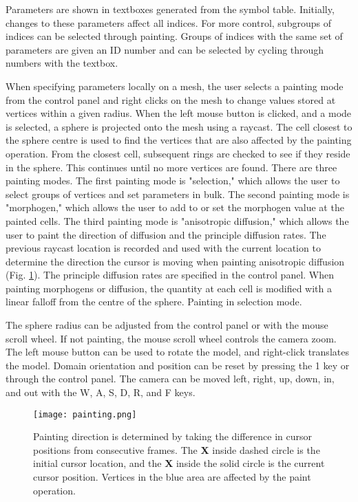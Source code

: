 Parameters are shown in textboxes generated from the symbol table. Initially, changes to these parameters affect all indices. For more control, subgroups of indices can be selected through painting. Groups of indices with the same set of parameters are given an ID number and can be selected by cycling through numbers with the  textbox. 

When specifying parameters locally on a mesh, the user selects a painting mode from the control panel and right clicks on the mesh to change values stored at vertices within a given radius. When the left mouse button is clicked, and a mode is selected, a sphere is projected onto the mesh using a raycast. The cell closest to the sphere centre is used to find the vertices that are also affected by the painting operation. From the closest cell, subsequent rings are checked to see if they reside in the sphere. This continues until no more vertices are found. There are three painting modes. The first painting mode is "selection," which allows the user to select groups of vertices and set parameters in bulk. The second painting mode is "morphogen," which allows the user to add to or set the morphogen value at the painted cells. The third painting mode is "anisotropic diffusion," which allows the user to paint the direction of diffusion and the principle diffusion rates. The previous raycast location is recorded and used with the current location to determine the direction the cursor is moving when painting anisotropic diffusion (Fig. \ref{fig:painting}). The principle diffusion rates are specified in the control panel. When painting morphogens or diffusion, the quantity at each cell is modified with a linear falloff from the centre of the sphere. Painting in selection mode.

The sphere radius can be adjusted from the control panel or with the mouse scroll wheel. If not painting, the mouse scroll wheel controls the camera zoom. The left mouse button can be used to rotate the model, and right-click translates the model. Domain orientation and position can be reset by pressing the 1 key or through the control panel. The camera can be moved left, right, up, down, in, and out with the W, A, S, D, R, and F keys.

\begin{figure}[ht]
	\centering
	\texttt{[image: painting.png]}	
	\caption{Painting direction is determined by taking the difference in cursor positions from consecutive frames. The \textbf{X} inside dashed circle is the initial cursor location, and the \textbf{X} inside the solid circle is the current cursor position. Vertices in the blue area are affected by the paint operation.} 
	\label{fig:painting}
\end{figure}

